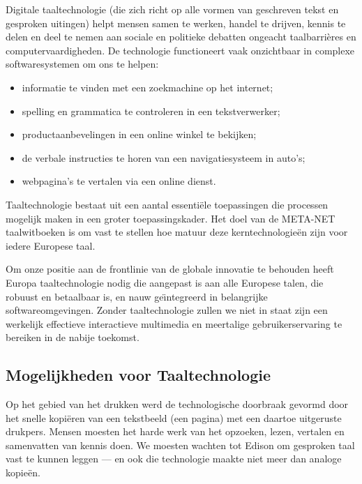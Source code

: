\begin{multicols}{2}
    Digitale taaltechnologie (die zich richt op alle vormen van geschreven tekst en gesproken uitingen) helpt mensen samen te werken, handel te drijven, kennis te delen en deel te nemen aan sociale en politieke debatten ongeacht taalbarri{\`e}res en computervaardigheden. De technologie functioneert vaak onzichtbaar in complexe softwaresystemen om ons te helpen:
    \begin{itemize}
 	\item informatie te vinden met een zoekmachine op het internet;
 	\item spelling en grammatica te controleren in een tekstverwerker;
 	\item productaanbevelingen in een online winkel te bekijken;
 	\item de verbale instructies te horen van een navigatiesysteem in auto's;
 	\item webpagina's te vertalen via een online dienst.
    \end{itemize}

    Taaltechnologie bestaat uit een aantal essenti{\"e}le toepassingen die processen mogelijk maken in een groter toepassingskader. Het doel van de META-NET taalwitboeken is om vast te stellen hoe matuur deze kerntechnologie{\"e}n zijn voor iedere Europese taal.


Om onze positie aan de frontlinie van de globale innovatie te behouden heeft Europa taaltechnologie nodig die aangepast is aan alle Europese talen, die robuust en betaalbaar is, en nauw ge{\"\i}ntegreerd in belangrijke softwareomgevingen. Zonder taaltechnologie zullen we niet in staat zijn een werkelijk effectieve interactieve multimedia en meertalige gebruikerservaring te bereiken in de nabije toekomst.

\subsection{Mogelijkheden voor Taaltechnologie}

    Op het gebied van het drukken werd de technologische doorbraak gevormd door het snelle kopi{\"e}ren van een tekstbeeld (een pagina) met een daartoe uitgeruste drukpers. Mensen moesten het harde werk van het opzoeken, lezen, vertalen en samenvatten van kennis doen. We moesten wachten tot Edison om gesproken taal vast te kunnen leggen --- en ook die technologie maakte niet meer dan analoge kopie{\"e}n.


\end{multicols}
